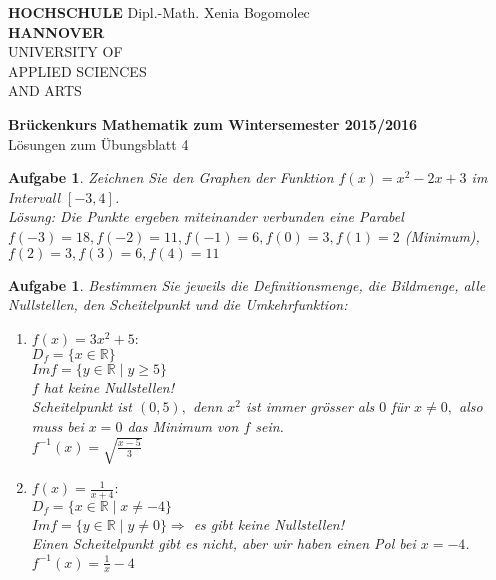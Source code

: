 \documentclass[12pt]{article}
\newtheorem{exercise}[satz]{Aufgabe}
\begin{document}
   \pagestyle{empty}
   \parindent 0cm
   \begin{minipage}{14cm}
   \footnotesize{\textbf{HOCHSCHULE} \hfill Dipl.-Math. Xenia Bogomolec\\
  \textbf{HANNOVER}\\
   UNIVERSITY OF\\
   APPLIED SCIENCES\\
   AND ARTS
   }
   \end{minipage}
   \vspace{1.0cm}

   \begin{center}
     {\Large \bf Br\"uckenkurs Mathematik zum Wintersemester 2015/2016} \\
     \vspace{0.5cm}
     {\large L\"osungen zum \"Ubungsblatt 4}  \\

  \end{center}
   \vspace{0.5cm}
   \normalsize
   \parindent0cm
   
  \begin{exercise}
  Zeichnen Sie den Graphen der Funktion $f(x) = x^2-2x+3$ im Intervall $[-3,4]$. \\
  L\"osung: Die Punkte ergeben miteinander verbunden eine Parabel\\
  $f(-3) = 18, f(-2) = 11, f(-1) = 6, f(0) = 3, f(1) = 2$ (Minimum), $f(2) = 3, f(3) = 6, f(4) = 11$ 
   \end{exercise}

  \begin{exercise}
  Bestimmen Sie jeweils die Definitionsmenge, die Bildmenge, alle Nullstellen, den Scheitelpunkt und die Umkehrfunktion:
  \begin{enumerate}
  \item[(a)] $f(x) = 3x^2+5:$\\
  $D_f = \{x \in \mathbb{R}\}$\\
  $Im f = \{y \in \mathbb{R}\mid y\geq 5\}$\\
  $f$ hat keine Nullstellen!\\
  Scheitelpunkt ist $(0,5),$ denn $x^2$ ist immer gr\"osser als $0$ f\"ur $x \neq 0,$ also muss bei $x = 0 $ das Minimum von $f$ sein.\\
  $f^{-1}(x) = \sqrt{\frac{x-5}{3}}$
  \item[(b)] $f(x) = \frac{1}{x+4}:$\\
  $D_f = \{x \in \mathbb{R} \mid x \neq -4\}$\\
  $Im f = \{y \in \mathbb{R}\mid y\neq 0\} \Rightarrow$ es gibt keine Nullstellen!\\
  Einen Scheitelpunkt gibt es nicht, aber wir haben einen Pol bei $x = -4$.\\
  $f^{-1}(x) = \frac{1}{x} - 4$ 
  \end{enumerate}
   \end{exercise}
   
\end{document}
